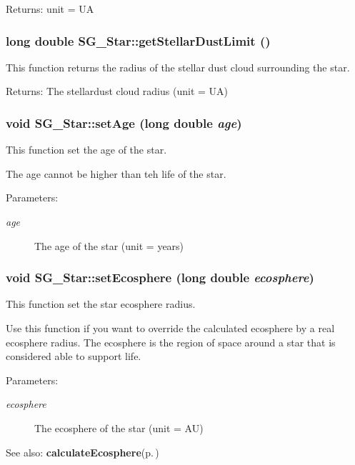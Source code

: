 \begin{Desc}
\item[Returns:]unit = UA \end{Desc}
\subsubsection{\setlength{\rightskip}{0pt plus 5cm}long double SG\_\-Star::get\-Stellar\-Dust\-Limit ()}\label{class_s_g___star_a14}


This function returns the radius of the stellar dust cloud surrounding the star. 

\begin{Desc}
\item[Returns:]The stellardust cloud radius (unit = UA) \end{Desc}
\subsubsection{\setlength{\rightskip}{0pt plus 5cm}void SG\_\-Star::set\-Age (long double {\em age})}\label{class_s_g___star_a7}


This function set the age of the star. 

The age cannot be higher than teh life of the star. \begin{Desc}
\item[Parameters:]
\begin{description}
\item[{\em age}]The age of the star (unit = years) \end{description}
\end{Desc}
\subsubsection{\setlength{\rightskip}{0pt plus 5cm}void SG\_\-Star::set\-Ecosphere (long double {\em ecosphere})}\label{class_s_g___star_a5}


This function set the star ecosphere radius. 

Use this function if you want to override the calculated ecosphere by a real ecosphere radius. The ecosphere is the region of space around a star that is considered able to support life. \begin{Desc}
\item[Parameters:]
\begin{description}
\item[{\em ecosphere}]The ecosphere of the star (unit = AU) \end{description}
\end{Desc}
\begin{Desc}
\item[See also:]{\bf calculate\-Ecosphere}{\rm (p.\,\pageref{class_s_g___star_b1})} \end{Desc}

